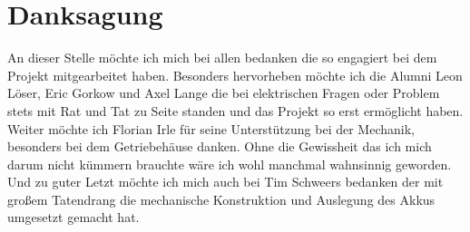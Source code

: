 

\chapter{Danksagung}

An dieser Stelle möchte ich mich bei allen bedanken die so engagiert bei dem Projekt mitgearbeitet haben. Besonders hervorheben möchte ich die Alumni Leon Löser, Eric Gorkow und Axel Lange die bei elektrischen Fragen oder Problem stets mit Rat und Tat zu Seite standen und das Projekt so erst ermöglicht haben. Weiter möchte ich Florian Irle für seine Unterstützung bei der Mechanik, besonders bei dem Getriebehäuse danken. Ohne die Gewissheit das ich mich darum nicht kümmern brauchte wäre ich wohl manchmal wahnsinnig geworden. Und zu guter Letzt möchte ich mich auch bei Tim Schweers bedanken der mit großem Tatendrang die mechanische Konstruktion und Auslegung des Akkus umgesetzt gemacht hat.